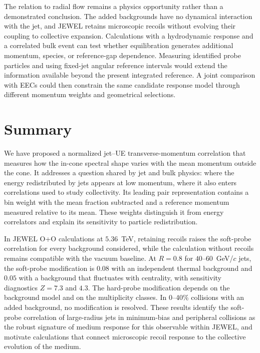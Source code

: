 \documentclass[aps,prc,twocolumn,superscriptaddress,nofootinbib,longbibliography,floatfix,10pt]{revtex4-2}
\begin{document}
The relation to radial flow remains a physics opportunity rather than a demonstrated conclusion. The added backgrounds have no dynamical interaction with the jet, and JEWEL retains microscopic recoils without evolving their coupling to collective expansion. Calculations with a hydrodynamic response and a correlated bulk event can test whether equilibration generates additional momentum, species, or reference-gap dependence. Measuring identified probe particles and using fixed-jet angular reference intervals would extend the information available beyond the present integrated reference. A joint comparison with EECs could then constrain the same candidate response model through different momentum weights and geometrical selections.

\section{Summary}\label{sec:summary}
We have proposed a normalized jet--UE transverse-momentum correlation that measures how the in-cone spectral shape varies with the mean momentum outside the cone. It addresses a question shared by jet and bulk physics: where the energy redistributed by jets appears at low momentum, where it also enters correlations used to study collectivity. Its leading pair representation contains a bin weight with the mean fraction subtracted and a reference momentum measured relative to its mean. These weights distinguish it from energy correlators and explain its sensitivity to particle redistribution.

In JEWEL O+O calculations at $5.36$~TeV, retaining recoils raises the soft-probe correlation for every background considered, while the calculation without recoils remains compatible with the vacuum baseline. At $R=0.8$ for $40$--$60$~GeV/$c$ jets, the soft-probe modification is $0.08$ with an independent thermal background and $0.05$ with a background that fluctuates with centrality, with sensitivity diagnostics $Z=7.3$ and $4.3$. The hard-probe modification depends on the background model and on the multiplicity classes. In 0--40\% collisions with an added background, no modification is resolved. These results identify the soft-probe correlation of large-radius jets in minimum-bias and peripheral collisions as the robust signature of medium response for this observable within JEWEL, and motivate calculations that connect microscopic recoil response to the collective evolution of the medium.


\end{document}
